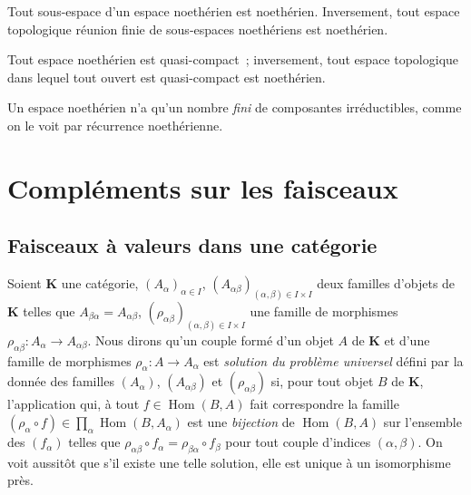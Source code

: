 \begin{env}[2.2.3]
\label{0.2.2.3-fr}
Tout sous-espace d'un espace noethérien est noethérien. Inversement, tout
espace topologique réunion finie de sous-espaces noethériens est noethérien.
\end{env}

\begin{env}[2.2.4]
\label{0.2.2.4-fr}
Tout espace noethérien est quasi-compact~; inversement, tout espace topologique
dans lequel tout ouvert est quasi-compact est noethérien.
\end{env}

\begin{env}[2.2.5]
\label{0.2.2.5-fr}
Un espace noethérien n'a qu'un nombre \emph{fini} de composantes
irréductibles, comme on le voit par récurrence noethérienne.
\end{env}

\section{Compléments sur les faisceaux}
\label{section:0.3-fr}

\subsection{Faisceaux à valeurs dans une catégorie}
\label{subsection:0.3.1-fr}

\begin{env}[3.1.1]
\label{0.3.1.1-fr}
Soient $\boldsymbol{K}$ une catégorie, $(A_\alpha)_{\alpha\in I}$,
$(A_{\alpha\beta})_{(\alpha,\beta)\in I\times I}$ deux familles d'objets de
$\boldsymbol{K}$ telles que $A_{\beta\alpha}=A_{\alpha\beta}$,
$(\rho_{\alpha\beta})_{(\alpha,\beta)\in I\times I}$ une famille de morphismes
$\rho_{\alpha\beta}:A_\alpha\to A_{\alpha\beta}$. Nous dirons qu'un couple
formé d'un objet $A$ de $\boldsymbol{K}$ et d'une famille de morphismes
$\rho_\alpha:A\to A_\alpha$ est \emph{solution du problème universel} défini
par la donnée des familles $(A_\alpha)$, $(A_{\alpha\beta})$ et
$(\rho_{\alpha\beta})$ si, pour tout objet $B$ de $\boldsymbol{K}$, l'application
qui, à tout $f\in\operatorname{Hom}(B,A)$ fait correspondre la famille
$(\rho_\alpha\circ f)\in\prod_\alpha\operatorname{Hom}(B,A_\alpha)$ est une
\emph{bijection} de $\operatorname{Hom}(B,A)$ sur l'ensemble des $(f_\alpha)$
telles que
$\rho_{\alpha\beta}\circ f_\alpha=\rho_{\beta\alpha}\circ f_\beta$ pour tout
couple d'indices $(\alpha,\beta)$. On voit aussitôt que s'il existe une telle
solution, elle est unique à un isomorphisme près.
\end{env}

